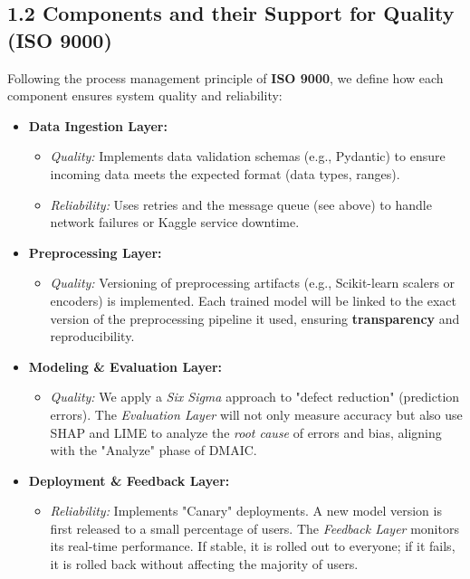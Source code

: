 \documentclass[12pt]{report}
\begin{document}
\subsection*{1.2 Components and their Support for Quality (ISO 9000)}

Following the process management principle of \textbf{ISO 9000}, we define how each component ensures system quality and reliability:

\begin{itemize}
    \item \textbf{Data Ingestion Layer:}
    \begin{itemize}
        \item \textit{Quality:} Implements data validation schemas (e.g., Pydantic) to ensure incoming data meets the expected format (data types, ranges).
        \item \textit{Reliability:} Uses retries and the message queue (see above) to handle network failures or Kaggle service downtime.
    \end{itemize}
    
    \item \textbf{Preprocessing Layer:}
    \begin{itemize}
        \item \textit{Quality:} Versioning of preprocessing artifacts (e.g., Scikit-learn scalers or encoders) is implemented. Each trained model will be linked to the exact version of the preprocessing pipeline it used, ensuring \textbf{transparency} and reproducibility.
    \end{itemize}
    
    \item \textbf{Modeling \& Evaluation Layer:}
    \begin{itemize}
        \item \textit{Quality:} We apply a \textit{Six Sigma} approach to "defect reduction" (prediction errors). The \textit{Evaluation Layer} will not only measure accuracy but also use SHAP and LIME to analyze the \textit{root cause} of errors and bias, aligning with the "Analyze" phase of DMAIC.
    \end{itemize}
    
    \item \textbf{Deployment \& Feedback Layer:}
    \begin{itemize}
        \item \textit{Reliability:} Implements "Canary" deployments. A new model version is first released to a small percentage of users. The \textit{Feedback Layer} monitors its real-time performance. If stable, it is rolled out to everyone; if it fails, it is rolled back without affecting the majority of users.
    \end{itemize}
\end{itemize}
\end{document}
